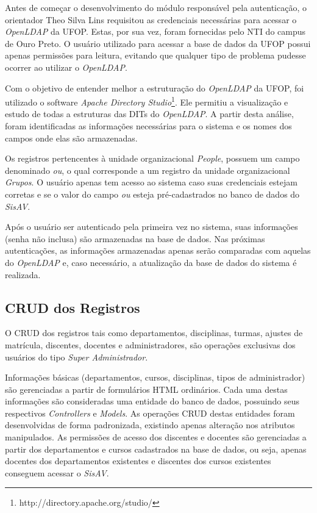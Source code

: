 \documentclass[
  12pt,       %
  openright,      %
  oneside,      %
  a4paper,      %
  english,      %
  french,        %
  spanish,     %
  brazil        %
  ]{abntex2-decsi}
\begin{document}
    Antes de começar o desenvolvimento do módulo responsável pela autenticação, o orientador Theo Silva Lins requisitou as credenciais necessárias para acessar o \textit{OpenLDAP} da UFOP. Estas, por sua vez, foram fornecidas pelo NTI do campus de Ouro Preto. O usuário utilizado para acessar a base de dados da UFOP possui apenas permissões para leitura, evitando que qualquer tipo de problema pudesse ocorrer ao utilizar o \textit{OpenLDAP}.

    Com o objetivo de entender melhor a estruturação do \textit{OpenLDAP} da UFOP, foi utilizado o software \textit{Apache Directory Studio}\footnote{http://directory.apache.org/studio/}. Ele permitiu a visualização e estudo de todas a estruturas das DITs do \textit{OpenLDAP}. A partir desta análise, foram identificadas as informações necessárias para o sistema e os nomes dos campos onde elas são armazenadas.
    
    Os registros pertencentes à unidade organizacional \textit{People}, possuem um campo denominado \textit{ou}, o qual corresponde a um registro da unidade organizacional \textit{Grupos}. O usuário apenas tem acesso ao sistema caso suas credenciais estejam corretas e se o valor do campo \textit{ou} esteja pré-cadastrados no banco de dados do \textit{SisAV}. 

    Após o usuário ser autenticado pela primeira vez no sistema, suas informações (senha não inclusa) são armazenadas na base de dados. Nas próximas autenticações, as informações armazenadas apenas serão comparadas com aquelas do \textit{OpenLDAP} e, caso necessário, a atualização da base de dados do sistema é realizada.

        \subsection{CRUD dos Registros}

    O CRUD dos registros tais como departamentos, disciplinas, turmas, ajustes de matrícula, discentes, docentes e administradores, são operações exclusivas dos usuários do tipo \textit{Super Administrador}. 

    Informações básicas (departamentos, cursos, disciplinas, tipos de administrador) são gerenciadas a partir de formulários HTML ordinários. Cada uma destas informações são consideradas uma entidade do banco de dados, possuindo seus respectivos \textit{Controllers} e \textit{Models}. As operações CRUD destas entidades foram desenvolvidas de forma padronizada, existindo apenas alteração nos atributos manipulados. As permissões de acesso dos discentes e docentes são gerenciadas a partir dos departamentos e cursos cadastrados na base de dados, ou seja, apenas docentes dos departamentos existentes e discentes dos cursos existentes conseguem acessar o \textit{SisAV}.     
\end{document}
